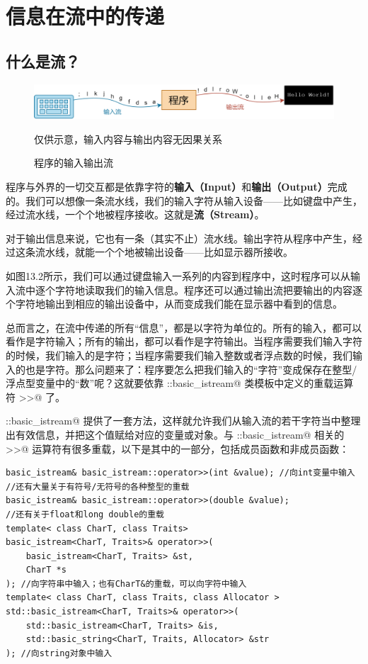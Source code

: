 \section{信息在流中的传递}
\subsection*{什么是流？}
\begin{figure}[htbp]
    \centering
    \includegraphics[width=\textwidth]{../images/generalized_parts/13_input_output_stream.drawio.png}
    \caption{程序的输入输出流}
    \footnotesize{仅供示意，输入内容与输出内容无因果关系}
\end{figure}
程序与外界的一切交互都是依靠字符的\textbf{输入（Input）}和\textbf{输出（Output）}完成的。我们可以想像一条流水线，我们的输入字符从输入设备——比如键盘中产生，经过流水线，一个个地被程序接收。这就是\textbf{流（Stream）}。\par
对于输出信息来说，它也有一条（其实不止）流水线。输出字符从程序中产生，经过这条流水线，就能一个个地被输出设备——比如显示器所接收。\par
如图13.2所示，我们可以通过键盘输入一系列的内容到程序中，这时程序可以从输入流中逐个字符地读取我们的输入信息。程序还可以通过输出流把要输出的内容逐个字符地输出到相应的输出设备中，从而变成我们能在显示器中看到的信息。\par
总而言之，在流中传递的所有``信息''，都是以字符为单位的。所有的输入，都可以看作是字符输入；所有的输出，都可以看作是字符输出。当程序需要我们输入字符的时候，我们输入的是字符；当程序需要我们输入整数或者浮点数的时候，我们输入的也是字符。那么问题来了：程序要怎么把我们输入的``字符''变成保存在整型/浮点型变量中的``数''呢？这就要依靠 \lstinline@std::basic_istream@ 类模板中定义的重载运算符 \lstinline@>>@ 了。\par
\lstinline@std::basic_istream@ 提供了一套方法，这样就允许我们从输入流的若干字符当中整理出有效信息，并把这个值赋给对应的变量或对象。与 \lstinline@std::basic_istream@ 相关的 \lstinline@>>@ 运算符有很多重载，以下是其中的一部分，包括成员函数和非成员函数：
\begin{lstlisting}
basic_istream& basic_istream::operator>>(int &value); //向int变量中输入
//还有大量关于有符号/无符号的各种整型的重载
basic_istream& basic_istream::operator>>(double &value);
//还有关于float和long double的重载
template< class CharT, class Traits>
basic_istream<CharT, Traits>& operator>>(
    basic_istream<CharT, Traits> &st,
    CharT *s
); //向字符串中输入；也有CharT&的重载，可以向字符中输入
template< class CharT, class Traits, class Allocator >
std::basic_istream<CharT, Traits>& operator>>(
    std::basic_istream<CharT, Traits> &is,
    std::basic_string<CharT, Traits, Allocator> &str
); //向string对象中输入
\end{lstlisting}
